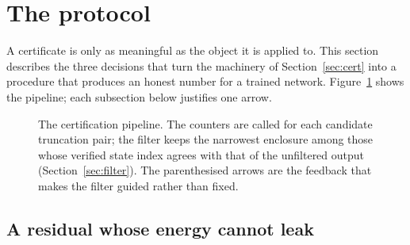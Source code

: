 \section{The protocol}
\label{sec:protocol}

A certificate is only as meaningful as the object it is applied to. This
section describes the three decisions that turn the machinery of
Section~\ref{sec:cert} into a procedure that produces an honest number for a
trained network. Figure~\ref{fig:pipeline} shows the pipeline; each subsection
below justifies one arrow.

\begin{figure}[tb]
\centering
{}
\caption{The certification pipeline. The counters are called for each
candidate truncation pair; the filter keeps the narrowest enclosure among
those whose verified state index agrees with that of the unfiltered output
(Section~\ref{sec:filter}). The parenthesised arrows are the feedback that
makes the filter guided rather than fixed.}
\label{fig:pipeline}
\end{figure}

\subsection{A residual whose energy cannot leak}
\label{sec:leakage}

